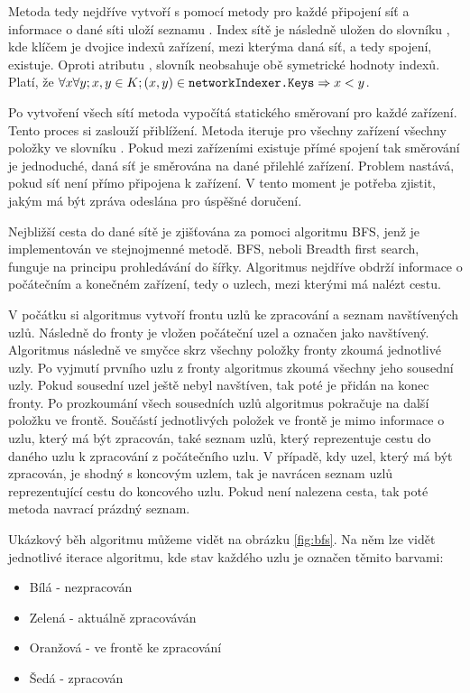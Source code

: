 Metoda tedy nejdříve vytvoří s pomocí metody  pro každé připojení síť a informace o dané síti uloží seznamu . Index sítě je následně uložen do slovníku , kde klíčem je dvojice indexů zařízení, mezi kterýma daná síť, a tedy spojení, existuje. Oproti atributu , slovník neobsahuje obě symetrické hodnoty indexů. Platí, že $\forall x \forall y; x,y\in K; (x,y) \in \texttt{networkIndexer.Keys} \Rightarrow x < y$. 

Po vytvoření všech sítí metoda vypočítá statického směrovaní pro každé zařízení. Tento proces si zaslouží přiblížení. Metoda iteruje pro všechny zařízení všechny položky ve slovníku . Pokud mezi zařízeními existuje přímé spojení tak směrování je jednoduché, daná síť je směrována na dané přilehlé zařízení. Problem nastává, pokud síť není přímo připojena k zařízení. V tento moment je potřeba zjistit, jakým  má být zpráva odeslána pro úspěšné doručení.

Nejbližší cesta do dané sítě je zjišťována za pomoci algoritmu BFS, jenž je implementován ve stejnojmenné metodě. BFS, neboli Breadth first search, funguje na principu prohledávání do šířky. Algoritmus nejdříve obdrží informace o počátečním a konečném zařízení, tedy o uzlech, mezi kterými má nalézt cestu. 

V počátku si algoritmus vytvoří frontu uzlů ke zpracování a seznam navštívených uzlů. Následně do fronty je vložen počáteční uzel a označen jako navštívený. Algoritmus následně ve smyčce skrz všechny položky fronty zkoumá jednotlivé uzly. Po vyjmutí prvního uzlu z fronty algoritmus zkoumá všechny jeho sousední uzly. Pokud sousední uzel ještě nebyl navštíven, tak poté je přidán na konec fronty. Po prozkoumání všech sousedních uzlů algoritmus pokračuje na další položku ve frontě. Součástí jednotlivých položek ve frontě je mimo informace o uzlu, který má být zpracován, také seznam uzlů, který reprezentuje cestu do daného uzlu k zpracování z počátečního uzlu. V případě, kdy uzel, který má být zpracován, je shodný s koncovým uzlem, tak je navrácen seznam uzlů reprezentující cestu do koncového uzlu. Pokud není nalezena cesta, tak poté metoda navrací prázdný seznam. \cite{pruvodce_alogritmu}

Ukázkový běh algoritmu můžeme vidět na obrázku \ref{fig:bfs}. Na něm lze vidět jednotlivé iterace algoritmu, kde stav každého uzlu je označen těmito barvami:

\begin{itemize}
    \item Bílá - nezpracován
    \item Zelená - aktuálně zpracováván
    \item Oranžová - ve frontě ke zpracování
    \item Šedá - zpracován
\end{itemize}

